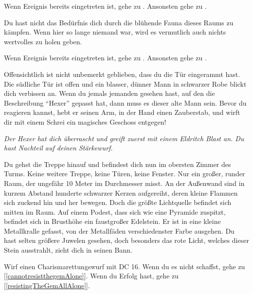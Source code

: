 Wenn Ereignis  bereits eingetreten ist, gehe zu .
Ansonsten gehe zu .


Du hast nicht das Bedürfnis dich durch die blühende Fauna dieses Raums zu kämpfen. Wenn hier so lange niemand war, wird es vermutlich auch nichts wertvolles zu holen geben.

Wenn Ereignis  bereits eingetreten ist, gehe zu .
Ansonsten gehe zu .


Offensichtlich ist nicht unbemerkt geblieben, dass du die Tür eingerammt hast. Die südliche Tür ist offen und ein blasser, dünner Mann in schwarzer Robe blickt dich verbissen an. Wenn du jemals jemanden gesehen hast, auf den die Beschreibung ``Hexer'' gepasst hat, dann muss es dieser alte Mann sein. Bevor du reagieren kannst, hebt er seinen Arm, in der Hand einen Zauberstab, und wirft dir mit einem Schrei ein magisches Geschoss entgegen!

\textit{Der Hexer hat dich überrascht und greift zuerst mit einem Eldritch Blast an. Du hast Nachteil auf deinen Stärkewurf.}



Du gehst die Treppe hinauf und befindest dich nun im obersten Zimmer des Turms. Keine weitere Treppe, keine Türen, keine Fenster. Nur ein großer, runder Raum, der ungefähr 10 Meter im Durchmesser misst. An der Außenwand sind in kurzem Abstand hunderte schwarzer Kerzen aufgereiht, deren kleine Flammen sich zuckend hin und her bewegen.
Doch die größte Lichtquelle befindet sich mitten im Raum. Auf einem Podest, dass sich wie eine Pyramide zuspitzt, befindet sich in Brusthöhe ein faustgroßer Edelstein. Er ist in eine kleine Metallkralle gefasst, von der Metallfäden verschiedenster Farbe ausgehen. Du hast selten größere Juwelen gesehen, doch besonders das rote Licht, welches dieser Stein ausstrahlt, zieht dich in seinen Bann.

Wirf einen Charismarettungswurf mit DC 16. Wenn du es nicht schaffst, gehe zu [\ref{cannotresistthegemAlone}]. Wenn du Erfolg hast, gehe zu [\ref{resistingTheGemAllAlone}].


